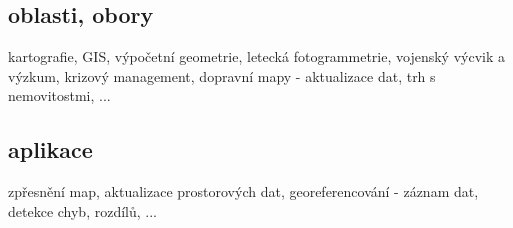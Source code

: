 \subsection{oblasti, obory}
\label{obory}
kartografie, GIS, výpočetní geometrie, letecká fotogrammetrie, vojenský výcvik a výzkum, krizový management, dopravní mapy - aktualizace dat, trh s nemovitostmi, ...

\subsection{aplikace}
\label{aplikace}
zpřesnění map, aktualizace prostorových dat, georeferencování - záznam dat, detekce chyb, rozdílů, ...

